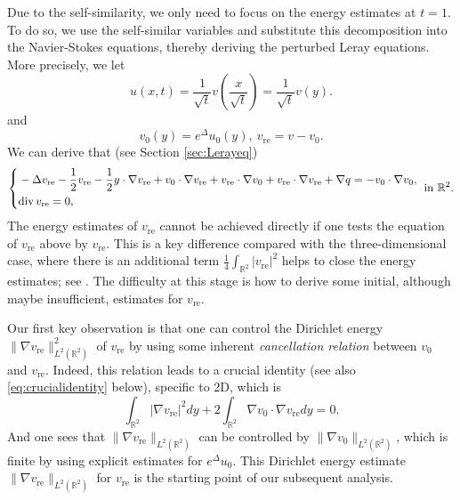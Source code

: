 \documentclass[12pt]{amsart}
\renewcommand{\div}{{\rm div \thinspace }}
\numberwithin{equation}{section}              %
\theoremstyle{remark}
\begin{document}
 Due to the self-similarity, we only need to focus on the energy estimates at $t=1$.
   To do so, we use the self-similar variables and substitute this decomposition into the Navier-Stokes equations, thereby deriving the perturbed Leray equations. 
More precisely,  we let
\begin{equation*}
		u(x,t)=\frac{1}{\sqrt{t}}v\left(\frac{x}{\sqrt{t}}\right)=\frac{1}{\sqrt{t}}v(y).
	\end{equation*}
    and
    \begin{equation*}
		v_0(y)= e^{\Delta}u_0(y), ~ v_{\text{re}}=v-v_0.
	\end{equation*}
We can derive that (see Section \ref{sec:Lerayeq})
    \begin{equation*}
		\left\{
		\begin{aligned}
			&-\Delta v_{\text{re}} -\frac{1}{2}v_{\text{re}} -\frac{1}{2}y\cdot \nabla v_{\text{re}} +  v_0\cdot \nabla v_{\text{re}} + v_{\text{re}}\cdot \nabla  v_0 + v_{\text{re}}\cdot \nabla v_{\text{re}} +\nabla q=- v_0\cdot\nabla  v_0, \\
			&  \div v_{\text{re}}=0,
		\end{aligned}
		\right. \textrm{ in }\mathbb{R}^2.
	\end{equation*}   
  The energy estimates of $v_{\text{re}}$ cannot be achieved directly if one tests the equation of $v_{\textrm{re}}$ above by $v_{\text{re}}$. This is a key difference compared with the 
three-dimensional case,  where there is an additional term $\frac{1}{4}\int_{\mathbb{R}^2} |v_{\text{re}}|^2$ 
	 helps to close the energy estimates; see \cite{Tsai17, Bradshaw17}.
The difficulty at this stage is how to derive some initial, although maybe insufficient, estimates for $v_{\text{re}}$. 
     
  
	Our first key observation  is that one can  control the Dirichlet energy $\|\nabla v_{\text{re}}\|_{L^2(\mathbb{R}^2)}^2$ of $v_{\text{re}}$  by using some inherent \emph{cancellation relation} between $ v_0$ and $v_{\text{re}}$. %
    Indeed, this relation leads to a
 crucial identity (see also \eqref{eq:crucialidentity} below), specific to 2D, which is
    \begin{equation*}
		\int_{\mathbb{R}^2} |\nabla v_{\text{re}}|^2 dy + 2\int_{\mathbb{R}^2} \nabla  v_0\cdot \nabla v_{\text{re}} dy =0.
	\end{equation*}
      And one sees that   $\|\nabla v_{\text{re}}\|_{L^2(\mathbb{R}^2)}$ can be controlled by $\|\nabla v_0\|_{L^2(\mathbb{R}^2)}$, which is finite by using explicit estimates for  $ e^{\Delta}u_0$. This Dirichlet energy estimate $\|\nabla v_{\text{re}}\|_{L^2(\mathbb{R}^2)}$ for $ v_{\text{re}}$ is the starting point of our subsequent analysis.
      
\end{document}

